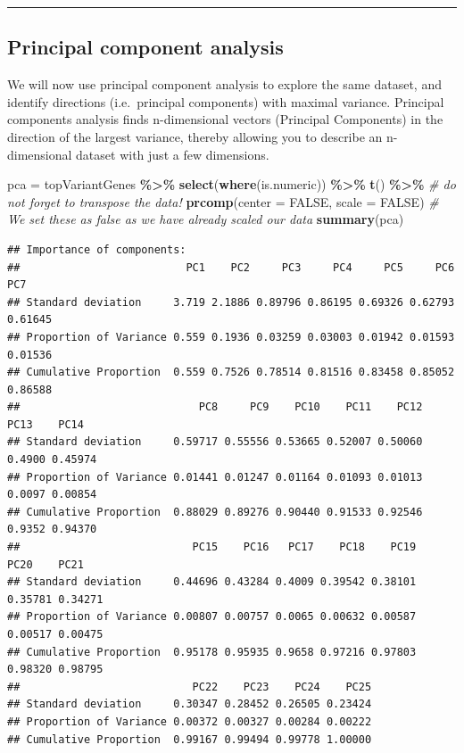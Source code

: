 \documentclass[
]{book}
\newenvironment{Shaded}{\begin{snugshade}}{\end{snugshade}}
\newcommand{\AttributeTok}[1]{\textcolor[rgb]{0.13,0.29,0.53}{#1}}
\newcommand{\CommentTok}[1]{\textcolor[rgb]{0.56,0.35,0.01}{\textit{#1}}}
\newcommand{\ConstantTok}[1]{\textcolor[rgb]{0.56,0.35,0.01}{#1}}
\newcommand{\FunctionTok}[1]{\textcolor[rgb]{0.13,0.29,0.53}{\textbf{#1}}}
\newcommand{\NormalTok}[1]{#1}
\newcommand{\OtherTok}[1]{\textcolor[rgb]{0.56,0.35,0.01}{#1}}
\newcommand{\SpecialCharTok}[1]{\textcolor[rgb]{0.81,0.36,0.00}{\textbf{#1}}}
\begin{document}
\begin{center}\rule{0.5\linewidth}{0.5pt}\end{center}

\hypertarget{principal-component-analysis}{%
\subsection{Principal component analysis}\label{principal-component-analysis}}

We will now use principal component analysis to explore the same dataset, and identify directions (i.e.~principal components) with maximal variance. Principal components analysis finds n-dimensional vectors (Principal Components) in the direction of the largest variance, thereby allowing you to describe an n-dimensional dataset with just a few dimensions.

\begin{Shaded}
\begin{Highlighting}[]
\NormalTok{pca }\OtherTok{=}\NormalTok{ topVariantGenes }\SpecialCharTok{\%\textgreater{}\%}
  \FunctionTok{select}\NormalTok{(}\FunctionTok{where}\NormalTok{(is.numeric)) }\SpecialCharTok{\%\textgreater{}\%}
  \FunctionTok{t}\NormalTok{() }\SpecialCharTok{\%\textgreater{}\%} \CommentTok{\# do not forget to transpose the data!}
  \FunctionTok{prcomp}\NormalTok{(}\AttributeTok{center =} \ConstantTok{FALSE}\NormalTok{, }\AttributeTok{scale =} \ConstantTok{FALSE}\NormalTok{) }\CommentTok{\# We set these as false as we have already scaled our data}
\FunctionTok{summary}\NormalTok{(pca)}
\end{Highlighting}
\end{Shaded}

\begin{verbatim}
## Importance of components:
##                          PC1    PC2     PC3     PC4     PC5     PC6     PC7
## Standard deviation     3.719 2.1886 0.89796 0.86195 0.69326 0.62793 0.61645
## Proportion of Variance 0.559 0.1936 0.03259 0.03003 0.01942 0.01593 0.01536
## Cumulative Proportion  0.559 0.7526 0.78514 0.81516 0.83458 0.85052 0.86588
##                            PC8     PC9    PC10    PC11    PC12   PC13    PC14
## Standard deviation     0.59717 0.55556 0.53665 0.52007 0.50060 0.4900 0.45974
## Proportion of Variance 0.01441 0.01247 0.01164 0.01093 0.01013 0.0097 0.00854
## Cumulative Proportion  0.88029 0.89276 0.90440 0.91533 0.92546 0.9352 0.94370
##                           PC15    PC16   PC17    PC18    PC19    PC20    PC21
## Standard deviation     0.44696 0.43284 0.4009 0.39542 0.38101 0.35781 0.34271
## Proportion of Variance 0.00807 0.00757 0.0065 0.00632 0.00587 0.00517 0.00475
## Cumulative Proportion  0.95178 0.95935 0.9658 0.97216 0.97803 0.98320 0.98795
##                           PC22    PC23    PC24    PC25
## Standard deviation     0.30347 0.28452 0.26505 0.23424
## Proportion of Variance 0.00372 0.00327 0.00284 0.00222
## Cumulative Proportion  0.99167 0.99494 0.99778 1.00000
\end{verbatim}
\end{document}
